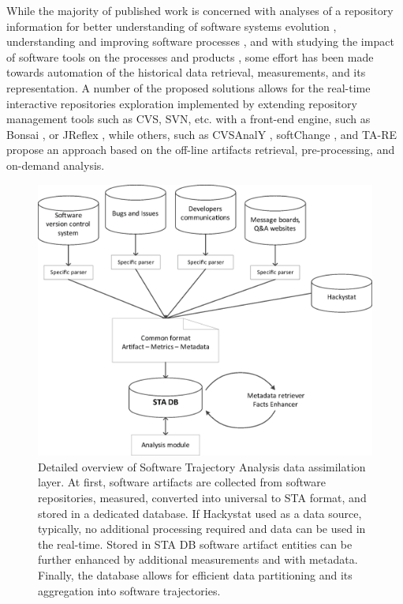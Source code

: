 While the majority of published work is concerned with analyses of a repository information 
for better understanding of software systems evolution \cite{citeulike:277045} \cite{citeulike:4000311}, 
understanding and improving software processes \cite{citeulike:5803126}, 
and with studying the impact of software tools on the processes and products \cite{citeulike:13125389},
some effort has been made towards automation of the historical data retrieval, measurements, and its representation. 
A number of the proposed solutions allows for the real-time interactive repositories exploration implemented by extending 
repository management tools such as CVS, SVN, etc. with a front-end engine, such as Bonsai \cite{bonsai},
or JReflex \cite{citeulike:3017440}, while others, such as CVSAnalY \cite{citeulike:6544724}, 
softChange \cite{citeulike:13125395}, and {TA}-{RE} \cite{citeulike:4000311} propose an approach based on 
the off-line artifacts retrieval, pre-processing, and on-demand analysis.

\begin{figure}[t]
   \centering
   \includegraphics[width=115mm]{figures/Flow.eps}
   \caption{Detailed overview of Software Trajectory Analysis data assimilation layer. 
    At first, software artifacts are collected from software repositories, measured, converted into 
    universal to STA format, and stored in a dedicated database.
    If Hackystat used as a data source, typically, no additional processing required and data can be used in the real-time.
    Stored in STA DB software artifact entities can be further enhanced by additional measurements and with metadata.
    Finally, the database allows for efficient data partitioning and its aggregation into software trajectories.}
   \label{fig:sta-assimilation}
\end{figure}

